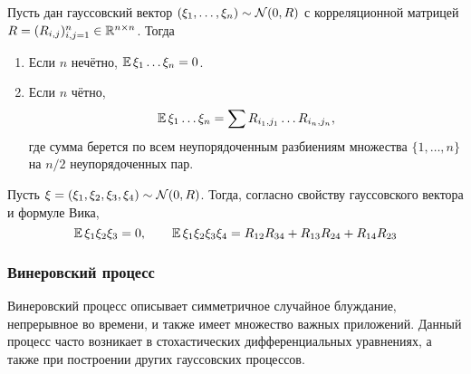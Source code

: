 \begin{theorem}
    \label{theorem:special:Wick_formula}
    Пусть дан гауссовский вектор $ (\xi_1, \ldots, \xi_n) \sim \mathcal{N}(0, R) $
    с корреляционной матрицей $ R = (R_{i,j})_{i,j=1}^n \in \mathbb{R}^{n \times n} $.
    Тогда
    \begin{enumerate}
        \item
            Если $ n $ нечётно, $ \operatorname{\mathbb{E}} \xi_1 \ldots \xi_n = 0 $.
        \item
            Если $ n $ чётно,
            \[
                \operatorname{\mathbb{E}} \xi_1 \ldots \xi_n = \sum R_{i_1, j_1} \ldots R_{i_n, j_n},
            \]
            где сумма берется по всем неупорядоченным разбиениям множества $ \{1, \ldots, n \} $ на $ n/2 $ неупорядоченных пар.
    \end{enumerate}
\end{theorem}

\begin{example}
    \label{example:special:Wick_formula}
    Пусть $ \xi = (\xi_1, \xi_2, \xi_3, \xi_4) \sim \mathcal{N}(0, R) $.
    Тогда, согласно свойству гауссовского вектора и формуле Вика,
    \[
        \operatorname{\mathbb{E}} \xi_1 \xi_2 \xi_3 = 0, \qquad
        \operatorname{\mathbb{E}} \xi_1 \xi_2 \xi_3 \xi_4 = R_{12} R_{34} + R_{13} R_{24} + R_{14} R_{23}
    \]
\end{example}



\subsubsection{Винеровский процесс} \label{subsubsection:Wiener}

Винеровский процесс описывает симметричное случайное блуждание, непрерывное во времени,
и также имеет множество важных приложений.
Данный процесс часто возникает в стохастических дифференциальных уравнениях,
а также при построении других гауссовских процессов.

